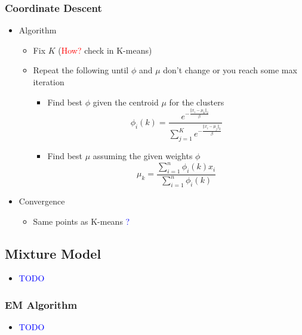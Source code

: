 \documentclass{article}
\newcommand{\red}[1]{\textcolor{red}{#1}}
\newcommand{\blue}[1]{\textcolor{blue}{#1}}
\begin{document}
\subsubsection{Coordinate Descent}
\begin{itemize}
    \item Algorithm
        \begin{itemize}
            \item Fix $K$ (\red{How?} check in K-means)
            \item Repeat the following until $\phi$ and $\mu$ don't change or you reach some max iteration
            \begin{itemize}
                \item Find best $\phi$ given the centroid $\mu$ for the clusters
                    $$\phi_i(k) = \frac{ e^{-\frac{\Vert x_i-\mu_k \Vert_2}{\beta} } } { \sum_{j=1}^K e^{-\frac{\Vert x_i-\mu_j \Vert_2}{\beta}} }$$
                \item Find best $\mu$ assuming the given weights $\phi$
                    $$\mu_k = \frac{\sum_{i=1}^n \phi_i(k) x_i}{\sum_{i=1}^n \phi_i(k)}$$
            \end{itemize}
        \end{itemize}
    \item Convergence
        \begin{itemize}
            \item Same points as K-means \blue{?}
        \end{itemize}
\end{itemize}


\subsection{Mixture Model}

\begin{itemize}
    \item \blue{TODO}
\end{itemize}

\subsubsection{EM Algorithm}
\begin{itemize}
    \item \blue{TODO}
\end{itemize}
\end{document}
